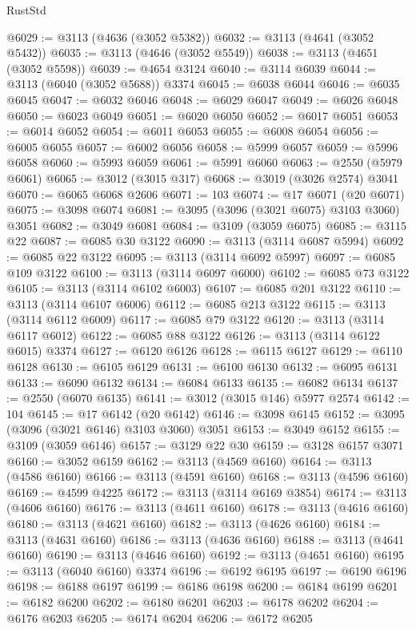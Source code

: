 \begin{lexlean}{RustStd}
\begin{coremodule}
@6029 := @3113 (@4636 (@3052 @5382))
@6032 := @3113 (@4641 (@3052 @5432))
@6035 := @3113 (@4646 (@3052 @5549))
@6038 := @3113 (@4651 (@3052 @5598))
@6039 := @4654 @3124
@6040 := @3114 @6039
@6044 := @3113 (@6040 (@3052 @5688)) @3374
@6045 := @6038 @6044
@6046 := @6035 @6045
@6047 := @6032 @6046
@6048 := @6029 @6047
@6049 := @6026 @6048
@6050 := @6023 @6049
@6051 := @6020 @6050
@6052 := @6017 @6051
@6053 := @6014 @6052
@6054 := @6011 @6053
@6055 := @6008 @6054
@6056 := @6005 @6055
@6057 := @6002 @6056
@6058 := @5999 @6057
@6059 := @5996 @6058
@6060 := @5993 @6059
@6061 := @5991 @6060
@6063 := @2550 (@5979 @6061)
@6065 := @3012 (@3015 @317)
@6068 := @3019 (@3026 @2574) @3041
@6070 := @6065 @6068 @2606
@6071 := 103
@6074 := @17 @6071 (@20 @6071)
@6075 := @3098 @6074
@6081 := @3095 (@3096 (@3021 @6075) @3103 @3060) @3051
@6082 := @3049 @6081
@6084 := @3109 (@3059 @6075)
@6085 := @3115 @22
@6087 := @6085 @30 @3122
@6090 := @3113 (@3114 @6087 @5994)
@6092 := @6085 @22 @3122
@6095 := @3113 (@3114 @6092 @5997)
@6097 := @6085 @109 @3122
@6100 := @3113 (@3114 @6097 @6000)
@6102 := @6085 @73 @3122
@6105 := @3113 (@3114 @6102 @6003)
@6107 := @6085 @201 @3122
@6110 := @3113 (@3114 @6107 @6006)
@6112 := @6085 @213 @3122
@6115 := @3113 (@3114 @6112 @6009)
@6117 := @6085 @79 @3122
@6120 := @3113 (@3114 @6117 @6012)
@6122 := @6085 @88 @3122
@6126 := @3113 (@3114 @6122 @6015) @3374
@6127 := @6120 @6126
@6128 := @6115 @6127
@6129 := @6110 @6128
@6130 := @6105 @6129
@6131 := @6100 @6130
@6132 := @6095 @6131
@6133 := @6090 @6132
@6134 := @6084 @6133
@6135 := @6082 @6134
@6137 := @2550 (@6070 @6135)
@6141 := @3012 (@3015 @146) @5977 @2574
@6142 := 104
@6145 := @17 @6142 (@20 @6142)
@6146 := @3098 @6145
@6152 := @3095 (@3096 (@3021 @6146) @3103 @3060) @3051
@6153 := @3049 @6152
@6155 := @3109 (@3059 @6146)
@6157 := @3129 @22 @30
@6159 := @3128 @6157 @3071
@6160 := @3052 @6159
@6162 := @3113 (@4569 @6160)
@6164 := @3113 (@4586 @6160)
@6166 := @3113 (@4591 @6160)
@6168 := @3113 (@4596 @6160)
@6169 := @4599 @4225
@6172 := @3113 (@3114 @6169 @3854)
@6174 := @3113 (@4606 @6160)
@6176 := @3113 (@4611 @6160)
@6178 := @3113 (@4616 @6160)
@6180 := @3113 (@4621 @6160)
@6182 := @3113 (@4626 @6160)
@6184 := @3113 (@4631 @6160)
@6186 := @3113 (@4636 @6160)
@6188 := @3113 (@4641 @6160)
@6190 := @3113 (@4646 @6160)
@6192 := @3113 (@4651 @6160)
@6195 := @3113 (@6040 @6160) @3374
@6196 := @6192 @6195
@6197 := @6190 @6196
@6198 := @6188 @6197
@6199 := @6186 @6198
@6200 := @6184 @6199
@6201 := @6182 @6200
@6202 := @6180 @6201
@6203 := @6178 @6202
@6204 := @6176 @6203
@6205 := @6174 @6204
@6206 := @6172 @6205

\end{coremodule}
\end{lexlean}
